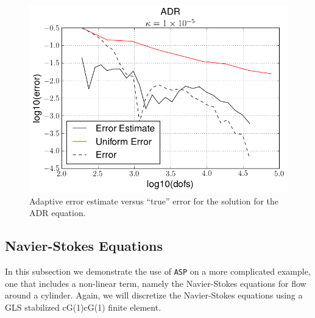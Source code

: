    \begin{figure}[h]
        \centering
        \includegraphics[scale=0.5]{Figures/AdaptiveADRkappa1E-5.png}
        \caption{Adaptive error estimate versus ``true'' error for the solution
            for the ADR equation.}
        \label{fig:ADR_err}
    \end{figure}

\subsection{Navier-Stokes Equations} \label{sse:NSE}

    In this subsection we demonstrate the use of \texttt{ASP} on a more complicated
    example, one that includes a non-linear term, namely the Navier-Stokes
    equations for flow around a cylinder.  Again, we will discretize the
    Navier-Stokes equations using a GLS stabilized cG(1)cG(1) finite element.

